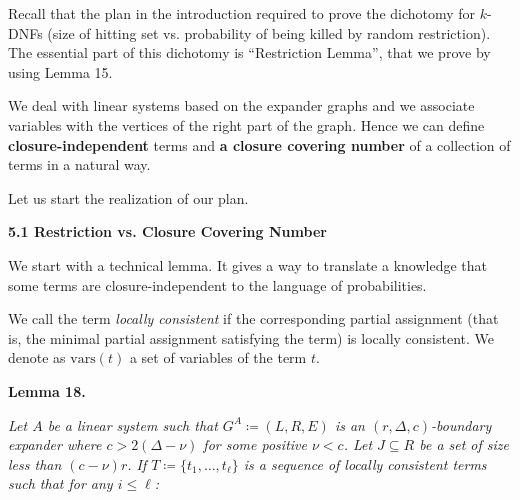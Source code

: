 \documentclass[10pt,a4paper]{article}
\begin{document}
Recall that the plan in the introduction required to prove the dichotomy for $k$-DNFs (size of hitting set
vs. probability of being killed by random restriction). The essential part of this dichotomy is
“Restriction Lemma”, that we prove by using Lemma 15.\par




We deal with linear systems based on the expander graphs and we associate variables with the vertices of
the right part of the graph. Hence we can define \textbf{closure-independent} terms and
\textbf{a closure covering number} of a collection of terms in a natural way.\par




Let us start the realization of our plan.\par




\par\medskip\noindent\textbf{
5.1 Restriction vs. Closure Covering Number}\par




We start with a technical lemma. It gives a way to translate a knowledge that some terms are
closure-independent to the language of probabilities.\par




We call the term \emph{locally consistent} if the corresponding partial assignment
(that is, the minimal partial assignment satisfying the term) is locally consistent. We denote
as $\text{vars}(t)$ a set of variables of the term $t$.\par





\par\medskip\noindent\textbf{
\textbf{Lemma 18}\textbf{.}
}\par



\emph{Let $A$ be a linear system such that $G^{A}\coloneqq(L,R,E)$ is an $(r,\Delta,c)$-boundary
expander where $c>2(\Delta-\nu)$ for some positive $\nu<c$. Let $J\subseteq R$ be a set of
size less than $(c-\nu)r$. If $T\coloneqq\{t_{1},\dots,t_{\ell}\}$ is a sequence of
locally consistent terms such that for any $i\leq\ell$:}\par
\end{document}
